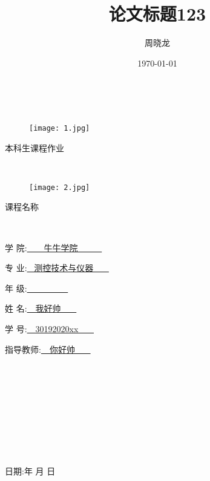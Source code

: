 \documentclass[lang=cn,11pt,a4paper,cite=authoryear]{elegantpaper}
\title{论文标题123}
\author{周晓龙}
\date{\today}
\renewcommand{\today}{\number\year 年 \number\month 月 \number\day 日}
\begin{document}
\clearpage
\

\begin{figure}[htbp]
  \centering
  \texttt{[image: 1.jpg]}
\end{figure}

\begin{center}
{\heiti {} 本科生课程作业}
\end{center} 

\

\begin{figure}[htbp]
  \centering
  \texttt{[image: 2.jpg]}
\end{figure}

\begin{center}
{\heiti {} 课程名称}
\end{center} 

\

\begin{center}
{\heiti {} 学 \quad \quad 院:\quad \underline{\ \ \ \ \quad 牛牛学院 \quad  \ \ \ \ \ }}

{\heiti {} 专 \quad \quad 业:\quad \underline{ \ 测控技术与仪器 \ \ \ }}

{\heiti {} 年 \quad \quad 级:\quad \underline{\ \ \ \ \quad {} \quad \quad \ \ \ \ \ }}

{\heiti {} 姓 \quad \quad 名:\quad \underline{\ \ \quad \quad 我好帅 \quad \quad \ \ \ }}

{\heiti {} 学 \quad \quad 号:\quad \underline{\ \ \quad 30192020xx \quad \ \ \ }}

{\heiti {} 指导教师:\quad \underline{\ \ \quad \quad 你好帅 \quad \quad \ \ \ }}

\

\

\

\

\

{\heiti {} 日期:\quad \today}
\end{center} 
\clearpage

\maketitle
\end{document}
